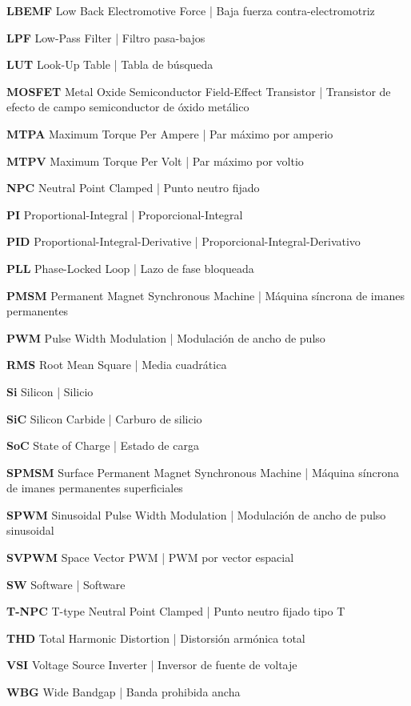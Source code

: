 \textbf{LBEMF} Low Back Electromotive Force | Baja fuerza contra-electromotriz

\textbf{LPF} Low-Pass Filter | Filtro pasa-bajos

\textbf{LUT} Look-Up Table | Tabla de búsqueda

\textbf{MOSFET} Metal Oxide Semiconductor Field-Effect Transistor | Transistor de efecto de campo semiconductor de óxido metálico

\textbf{MTPA} Maximum Torque Per Ampere | Par máximo por amperio

\textbf{MTPV} Maximum Torque Per Volt | Par máximo por voltio

\textbf{NPC} Neutral Point Clamped | Punto neutro fijado

\textbf{PI} Proportional-Integral | Proporcional-Integral

\textbf{PID} Proportional-Integral-Derivative | Proporcional-Integral-Derivativo

\textbf{PLL} Phase-Locked Loop | Lazo de fase bloqueada

\textbf{PMSM} Permanent Magnet Synchronous Machine | Máquina síncrona de imanes permanentes

\textbf{PWM} Pulse Width Modulation | Modulación de ancho de pulso

\textbf{RMS} Root Mean Square | Media cuadrática

\textbf{Si} Silicon | Silicio

\textbf{SiC} Silicon Carbide | Carburo de silicio

\textbf{SoC} State of Charge | Estado de carga

\textbf{SPMSM} Surface Permanent Magnet Synchronous Machine | Máquina síncrona de imanes permanentes superficiales

\textbf{SPWM} Sinusoidal Pulse Width Modulation | Modulación de ancho de pulso sinusoidal

\textbf{SVPWM} Space Vector PWM | PWM por vector espacial

\textbf{SW} Software | Software

\textbf{T-NPC} T-type Neutral Point Clamped | Punto neutro fijado tipo T 

\textbf{THD} Total Harmonic Distortion | Distorsión armónica total

\textbf{VSI} Voltage Source Inverter | Inversor de fuente de voltaje

\textbf{WBG} Wide Bandgap | Banda prohibida ancha